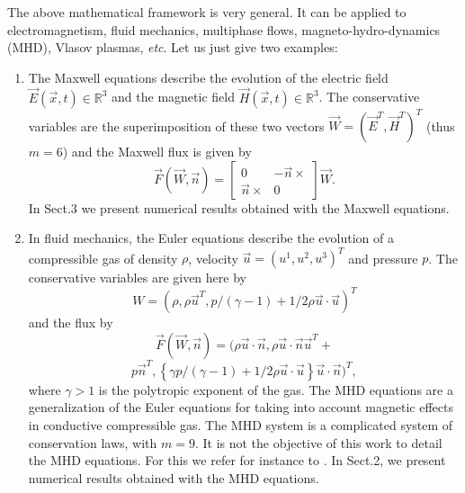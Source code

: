 \documentclass{svmult}
\begin{document}
The above mathematical framework is very general. It can be applied to
electromagnetism, fluid mechanics, multiphase flows,
magneto-hydro-dynamics (MHD), Vlasov plasmas, \emph{etc}. Let us just
give two examples:
\begin{enumerate}
\item The Maxwell equations describe the evolution of the electric
  field $\vec{E}(\vec{x},t)\in \mathbb{R}^3$ and the magnetic field
  $\vec{H}(\vec{x},t)\in \mathbb{R}^3$. The conservative variables are
  the superimposition of these two vectors
  $\vec{W}=(\vec{E}^T,\vec{H}^T)^T$ (thus $m=6$) and the Maxwell flux
  is given
  by
  \begin{equation}\vec{F}(\vec{W},\vec{n})=\left[\begin{array}{cc}
        0 & -\vec{n}\times\\ \vec{n}\times & 0
      \end{array}\right]\vec{W}.
  \end{equation}
  In Sect.3 we present numerical results obtained with the Maxwell
  equations.
\item In fluid mechanics, the Euler equations describe the evolution
  of a compressible gas of density $\rho$, velocity
  $\vec{u}=(u^1,u^2,u^3)^T$ and pressure $p$. The conservative
  variables are given here by \begin{equation}W=(\rho,\rho
    \vec{u}^T,p/(\gamma-1)+1/2 \rho \vec{u}\cdot
    \vec{u})^T\end{equation} and the flux by \begin{equation}
      \vec{F}(\vec{W},\vec{n})=(\rho \vec{u} \cdot \vec{n}, \rho
      \vec{u}\cdot \vec{n} \vec{u}^T
      + \end{equation} \begin{equation}p \vec{n}^T,\left\{ \gamma
      p/(\gamma-1)+1/2 \rho \vec{u}\cdot \vec{u} \right\} \vec{u}\cdot
      \vec{n})^T,\end{equation}where $\gamma>1$ is the polytropic
    exponent of the gas. The MHD equations are a generalization of the
    Euler equations for taking into account magnetic effects in
    conductive compressible gas. The MHD system is a complicated
    system of conservation laws, with $m=9$. It is not the objective
    of this work to detail the MHD equations. For this we refer for
    instance to \cite{massaro2014numerical}. In Sect.2, we present
    numerical results obtained with the MHD equations.
\end{enumerate}
\end{document}
